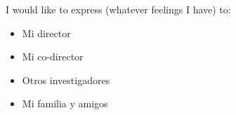 \cleardoublepage


\begin{acknowledgements}

I would like to express (whatever feelings I have) to:

\begin{itemize}
 \item Mi director
 \vspace*{3mm}
 \item Mi co-director
 \vspace*{3mm}
 \item Otros investigadores
 \vspace*{3mm}
 \item Mi familia y amigos
\end{itemize}

\end{acknowledgements}
